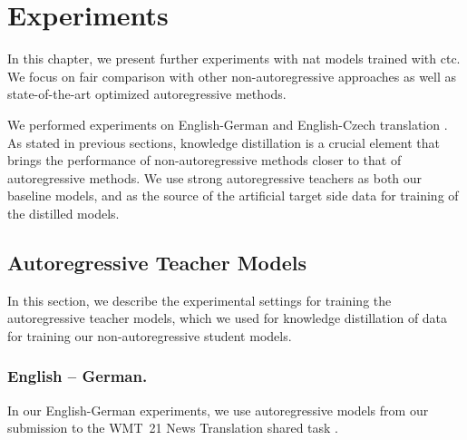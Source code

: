 \chapter{Experiments}
\label{chap:experiments}

In this chapter, we present further experiments with \ac{nat} models trained
with \ac{ctc}. We focus on fair comparison with other non-autoregressive
approaches as well as state-of-the-art optimized autoregressive methods.

We performed experiments on English-German and English-Czech translation . As stated in previous sections, knowledge
distillation \citep{kim-rush-2016-sequence} is a crucial element that brings
the performance of non-autoregressive methods closer to that of autoregressive
methods. We use strong autoregressive teachers as both our baseline models, and
as the source of the artificial target side data for training of the distilled
models.

\section{Autoregressive Teacher Models}
\label{sec:exp:autoregressive}

In this section, we describe the experimental settings for training the
autoregressive teacher models, which we used for knowledge distillation of data
for training our non-autoregressive student models.

\subsection{English -- German.}


\noindent
In our English-German experiments, we use autoregressive models from our
submission to the WMT~21 News Translation shared task .

